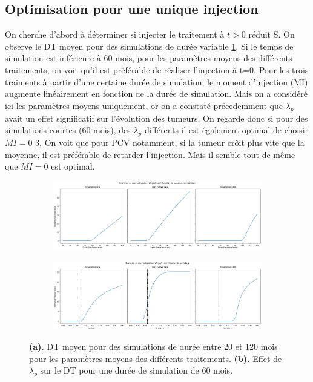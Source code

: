 \documentclass[12pt]{article}
\begin{document}
\subsection{Optimisation pour une unique injection}
On cherche d'abord à déterminer si injecter le traitement à $ t > 0$  réduit S.  On observe le DT moyen pour des simulations de durée variable \ref{fig:duree_simu}. Si le temps de simulation est inférieure à 60 mois, pour les paramètres moyens des différents traitements, on voit qu'il est préférable de réaliser l'injection à t=0.  Pour les trois traiments à partir d'une certaine durée de simulation, le moment d'injection (MI) augmente linéairement en fonction de la durée de simulation. Mais on a considéré ici les paramètres moyens uniquement, or on a constaté précedemment que $\lambda_{p}$ avait un effet significatif sur l'évolution des tumeurs. On regarde donc si pour des simulations courtes (60 mois), des $\lambda_{p}$ différents il est également optimal de choisir $MI = 0$ \ref{fig:effet_lambda_moment}. On voit que pour PCV notamment, si la tumeur crôit plus vite que la moyenne, il est préférable de retarder l'injection. Mais il semble tout de même que $MI = 0$ est optimal.
\begin{figure}

    \centering
    \begin{subfigure}[t]{\textwidth}
        \centering
        \includegraphics[width=\textwidth]{Image/duree_simu.png} 
        \caption{} \label{fig:duree_simu}
    \end{subfigure}

    \vspace{0.5cm}

    \begin{subfigure}[t]{\textwidth}
        \centering
        \includegraphics[width=\textwidth]{Image/effet_lambda_moment.png}
        \caption{} \label{fig:effet_lambda_moment}
    \end{subfigure}

    \caption{\textbf{(a).} DT moyen pour des simulations de durée entre 20 et 120 mois pour les paramètres moyens des différents traitements. \textbf{(b).} Effet de $\lambda_{p}$ sur le DT pour une durée de simulation de 60 mois.}
\end{figure}
\end{document}
